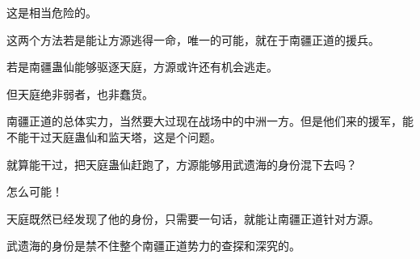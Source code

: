 \begin{this_body}
这是相当危险的。

这两个方法若是能让方源逃得一命，唯一的可能，就在于南疆正道的援兵。

若是南疆蛊仙能够驱逐天庭，方源或许还有机会逃走。

但天庭绝非弱者，也非蠢货。

南疆正道的总体实力，当然要大过现在战场中的中洲一方。但是他们来的援军，能不能干过天庭蛊仙和监天塔，这是个问题。

就算能干过，把天庭蛊仙赶跑了，方源能够用武遗海的身份混下去吗？

怎么可能！

天庭既然已经发现了他的身份，只需要一句话，就能让南疆正道针对方源。

武遗海的身份是禁不住整个南疆正道势力的查探和深究的。

\end{this_body}

